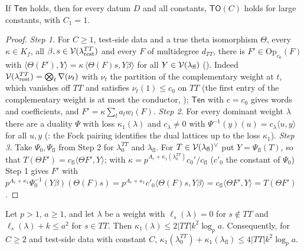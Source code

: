\begin{proposition}\label{pf:linkG:tsop}
If $\mathsf{Ten}$ holds, then for every datum $D$ and all constants, $\mathsf{TO}(C)$ holds for large constants, with $C_1=1$.
\end{proposition}

\begin{proof}
\emph{Step 1.} For $C\ge1$, test-side data and a true theta isomorphism $\Theta$, every $\kappa\in K_f$, all
$\beta,s\in\mathcal V(\lambda^{TT}_{\mathrm{rest}})$ and every $F$ of multidegree $d_{TT}$, there is $F'\in\mathrm{Op}_{c_0}(F)$ with
$\langle\Theta(F'),Y\rangle=\kappa\,\langle\Theta(F)s,Y\beta\rangle$ for all $Y\in\mathcal V(\lambda_{\mathrm{fl}})$
(). Indeed $\mathcal V(\lambda_{\mathrm{rest}}^{TT})=\bigotimes_t\nabla(\nu_t)$
with $\nu_t$ the partition of the complementary weight at $t$, which vanishes off $TT$ and satisfies $\nu_t(1)\le c_0$ on $TT$
(the first entry of the complementary weight is at most the conductor,
); $\mathsf{Ten}$ with $c=c_0$ gives words and
coefficients, and $F'=\kappa\sum_la_lw_l(F)$. \emph{Step 2.} For every dominant weight $\lambda$ there are a duality $\Psi$ with
loss $\kappa_1(\lambda)$ and $c_\lambda\ne0$ with $\Psi^{-1}(y)(u)=c_\lambda\langle u,y\rangle$ for all $u,y$
(: the Fock pairing identifies the dual lattices up to the
loss $\kappa_1$). \emph{Step 3.} Take $\Psi_0,\Psi_{\mathrm{fl}}$ from Step 2 for $\lambda_0^{TT}$ and $\lambda_{\mathrm{fl}}$. For
$T\in\mathcal V(\lambda_{\mathrm{fl}})^\vee$ put $Y=\Psi_{\mathrm{fl}}(T)$, so that $T(\Theta F')=c_{\mathrm{fl}}\langle\Theta F',Y\rangle$; with
$\kappa=p^{A_r+\kappa_1(\lambda^{TT}_0)}c_0'/c_{\mathrm{fl}}$ ($c'_0$ the constant of $\Psi_0$) Step 1 gives $F'$ with
$p^{A_r+\kappa_1}\Psi_0^{-1}(Y\beta)(\Theta(F)s)=p^{A_r+\kappa_1}c'_0\langle\Theta(F)s,Y\beta\rangle=c_{\mathrm{fl}}\langle\Theta
F',Y\rangle=T(\Theta F')$.
\end{proof}

\begin{lemma}\label{pf:linkG:logsize}
Let $p>1$, $a\ge1$, and let $\lambda$ be a weight with $\ell_s(\lambda)=0$ for $s\notin TT$ and $\ell_s(\lambda)+k\le a^2$ for
$s\in TT$. Then $\kappa_1(\lambda)\le2|TT|k^2\log_pa$. Consequently, for $C\ge2$ and test-side data with constant $C$,
$\kappa_1(\lambda_0^{TT})+\kappa_1(\lambda_{\mathrm{fl}})\le4|TT|k^2\log_pa$.
\end{lemma}

